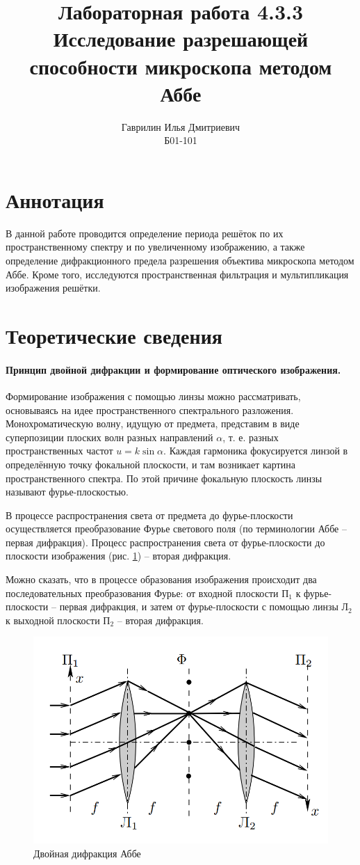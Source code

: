 \documentclass[a4paper, 12pt]{article}%
\author{Гаврилин Илья Дмитриевич \\
	Б01-101}
\title{\textbf{Лабораторная работа 4.3.3\\ 
		Исследование разрешающей способности микроскопа методом Аббе}}
\begin{document}
	\maketitle
	\section{Аннотация}
	
	В данной работе проводится определение периода решёток по их пространственному спектру и по увеличенному изображению, а также определение дифракционного предела разрешения объектива микроскопа методом Аббе. Кроме того, исследуются пространственная фильтрация и мультипликация изображения решётки.
	
	\section{Теоретические сведения}
	
	\paragraph{Принцип двойной дифракции и формирование оптического	изображения.}
	
	Формирование изображения с помощью линзы можно рассматривать, основываясь на идее пространственного спектрального разложения. Монохроматическую волну, идущую от предмета, представим в виде суперпозиции плоских волн разных направлений $ \alpha $, т. е. разных пространственных частот $ u = k \sin \alpha $. Каждая гармоника фокусируется линзой в определённую точку фокальной плоскости, и там возникает картина пространственного спектра. По этой причине фокальную плоскость линзы называют фурье-плоскостью.
	
	В процессе распространения света от предмета до фурье-плоскости осуществляется преобразование Фурье светового поля (по терминологии Аббе -- первая дифракция). Процесс распространения света от фурье-плоскости до плоскости изображения (рис. \ref{fig:screenshot1}) -- вторая дифракция.
	
	Можно сказать, что в процессе образования изображения происходит два последовательных преобразования Фурье: от входной плоскости $ П_1 $ к фурье-плоскости -- первая дифракция, и затем от фурье-плоскости с помощью линзы $ Л_2 $ к выходной плоскости $ П_2 $ -- вторая дифракция.
	
	\begin{figure}[H]
		\centering
		\includegraphics[width=0.7\linewidth]{Screenshot_1}
		\caption{Двойная дифракция Аббе}
		\label{fig:screenshot1}
	\end{figure}
	
\end{document}
